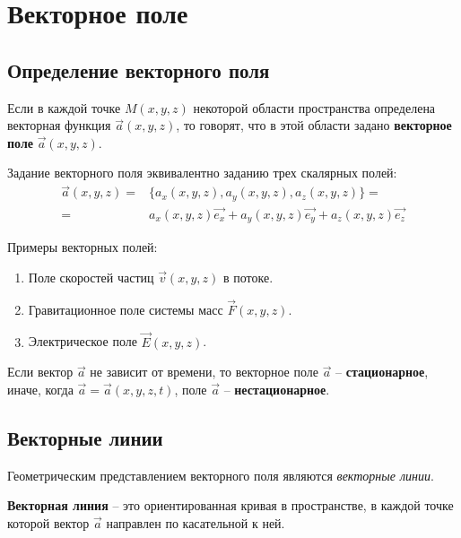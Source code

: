 \section{Векторное поле}

\subsection{Определение векторного поля}

	\begin{definition}
	Если в каждой точке \( M(x, y, z) \) некоторой области пространства определена векторная функция \( \vec{a} (x, y, z) \), то говорят, что в этой области задано \textbf{векторное поле} \( \vec{a} (x, y, z) \).
	\end{definition}
	
	Задание векторного поля эквивалентно заданию трех скалярных полей:
	\begin{align}
		\vec{a}(x, y, z) = & \{a_x(x, y, z), a_y(x, y, z), a_z(x, y, z)\} = \nonumber \\
		= & a_x(x, y, z)\vec{e_x} + a_y(x, y, z)\vec{e_y} + a_z(x, y, z)\vec{e_z} \nonumber
	\end{align}
	
	Примеры векторных полей:
	\begin{enumerate}
	\item
		Поле скоростей частиц \( \vec{v}(x, y, z) \) в потоке.
	\item
		Гравитационное поле системы масс \( \vec{F}(x, y, z) \).
	\item
		Электрическое поле \( \vec{E}(x, y, z) \).
	\end{enumerate}
	
	Если вектор \( \vec{a} \) не зависит от времени, то векторное поле \( \vec{a} \) -- \textbf{стационарное}, иначе, когда \( \vec{a} = \vec{a}(x, y, z, t) \), поле \( \vec{a} \) -- \textbf{нестационарное}.
	
\subsection{Векторные линии}

	Геометрическим представлением векторного поля являются \textit{векторные линии}.
	
	\begin{definition}
	\textbf{Векторная линия} -- это ориентированная кривая в пространстве, в каждой точке которой вектор \( \vec{a} \) направлен по касательной к ней.
	\end{definition}
	

